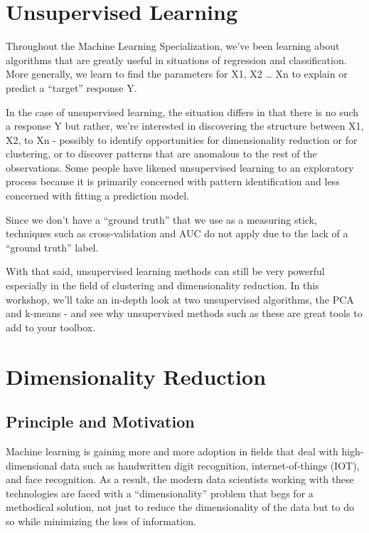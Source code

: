 \documentclass[]{article}
\begin{document}
\hypertarget{unsupervised-learning}{%
\section{Unsupervised Learning}\label{unsupervised-learning}}

Throughout the Machine Learning Specialization, we've been learning
about algorithms that are greatly useful in situations of regression and
classification. More generally, we learn to find the parameters for X1,
X2 \ldots{} Xn to explain or predict a ``target'' response Y.

In the case of unsupervised learning, the situation differs in that
there is no such a response Y but rather, we're interested in
discovering the structure between X1, X2, to Xn - possibly to identify
opportunities for dimensionality reduction or for clustering, or to
discover patterns that are anomalous to the rest of the observations.
Some people have likened unsupervised learning to an exploratory process
because it is primarily concerned with pattern identification and less
concerned with fitting a prediction model.

Since we don't have a ``ground truth'' that we use as a measuring stick,
techniques such as cross-validation and AUC do not apply due to the lack
of a ``ground truth'' label.

With that said, unsupervised learning methods can still be very powerful
especially in the field of clustering and dimensionality reduction. In
this workshop, we'll take an in-depth look at two unsupervised
algorithms, the PCA and k-means - and see why unsupervised methods such
as these are great tools to add to your toolbox.

\hypertarget{dimensionality-reduction}{%
\section{Dimensionality Reduction}\label{dimensionality-reduction}}

\hypertarget{principle-and-motivation}{%
\subsection{Principle and Motivation}\label{principle-and-motivation}}

Machine learning is gaining more and more adoption in fields that deal
with high-dimensional data such as handwritten digit recognition,
internet-of-things (IOT), and face recognition. As a result, the modern
data scientists working with these technologies are faced with a
``dimensionality'' problem that begs for a methodical solution, not just
to reduce the dimensionality of the data but to do so while minimizing
the loss of information.
\end{document}
